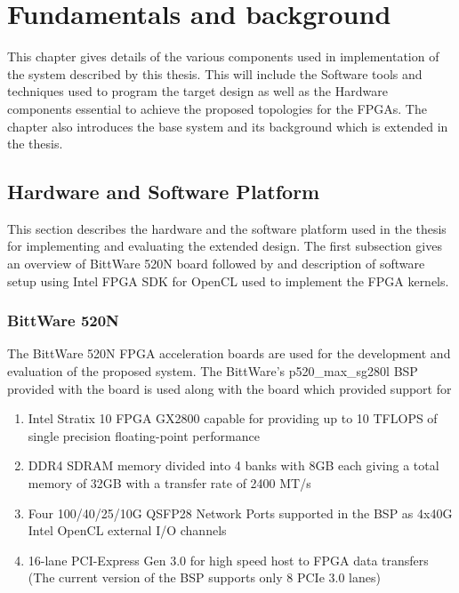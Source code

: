 \chapter{Fundamentals and background}
\label{cha:Fundamentals}

This chapter gives details of the various components used in implementation
of the system described by this thesis. This will include the Software
tools and techniques used to program the target design as well as the Hardware
components essential to achieve the proposed topologies for the FPGAs. The chapter
also introduces the base system and its background which is extended in the thesis.

\section{Hardware and Software Platform}

This section describes the hardware and the software platform used in the
thesis for implementing and evaluating the extended design. The first subsection
gives an overview of BittWare 520N board followed by and description of software
setup using Intel FPGA SDK for OpenCL used to implement the FPGA kernels.

\subsection{BittWare 520N}

The BittWare 520N FPGA acceleration boards are used for the development
and evaluation of the proposed system. The BittWare's p520\_max\_sg280l BSP
provided with the board is used along with the board which provided support for
\begin{enumerate}
    \item Intel Stratix 10 FPGA GX2800 capable for providing up to 10 TFLOPS of single
    precision floating-point performance
    \item DDR4 SDRAM memory divided into 4 banks with 8GB each giving a total memory of 32GB with
    a transfer rate of 2400 MT/s
    \item Four 100/40/25/10G QSFP28 Network Ports supported in the
    BSP as 4x40G Intel OpenCL external I/O channels
    \item 16-lane PCI-Express Gen 3.0 for high speed host to FPGA data transfers (The current version of
    the BSP supports only 8 PCIe 3.0 lanes)
\end{enumerate}

